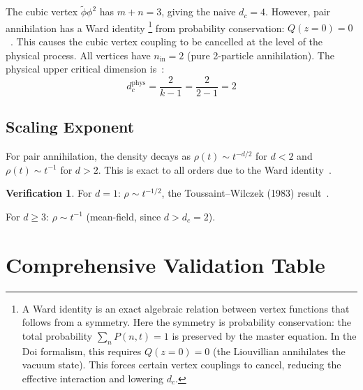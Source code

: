 \documentclass[11pt,a4paper]{article}
\theoremstyle{definition}
\newtheorem*{verification}{Verification}
\newcommand{\phit}{\tilde{\phi}}
\begin{document}
The cubic vertex $\phit\phi^2$ has $m+n = 3$, giving the naive
$d_c = 4$. However, pair annihilation has a Ward identity%
\footnote{A Ward identity is an exact algebraic relation between
vertex functions that follows from a symmetry. Here the symmetry is
probability conservation: the total probability $\sum_n P(n,t) = 1$
is preserved by the master equation. In the Doi formalism, this
requires $Q(z{=}0) = 0$ (the Liouvillian annihilates the vacuum
state). This forces certain vertex couplings to cancel, reducing
the effective interaction and lowering $d_c$.}
from probability conservation: $Q(z{=}0) = 0$~\cite{lee1994,tauber2005}.
This causes the cubic vertex coupling to be cancelled at the level
of the physical process. All vertices have $n_{\mathrm{in}} = 2$
(pure 2-particle annihilation). The physical upper critical dimension
is~\cite{lee1994}:
\begin{equation}
d_c^{\mathrm{phys}} = \frac{2}{k-1} = \frac{2}{2-1} = 2
\end{equation}

\subsection{Scaling Exponent}

For pair annihilation, the density decays as
$\rho(t) \sim t^{-d/2}$ for $d < 2$ and $\rho(t) \sim t^{-1}$ for
$d > 2$. This is exact to all orders due to the Ward
identity~\cite{lee1994}.

\begin{verification}
For $d = 1$: $\rho \sim t^{-1/2}$, the Toussaint--Wilczek (1983)
result~\cite{toussaint1983}. \checkmark

For $d \geq 3$: $\rho \sim t^{-1}$ (mean-field, since $d > d_c = 2$). \checkmark
\end{verification}

\section{Comprehensive Validation Table}
\label{sec:validation}
\end{document}
